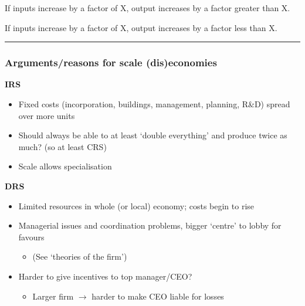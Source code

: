 \documentclass[]{article}
\providecommand{\tightlist}{%
  \setlength{\itemsep}{0pt}\setlength{\parskip}{0pt}}
\begin{document}
\bigskip

\begin{description}
\tightlist
\item[Increasing returns to scale (IRS)]
If inputs increase by a factor of X, output increases by a factor
greater than X.
\item[Decreasing returns to scale (DRS)]
If inputs increase by a factor of X, output increases by a factor less
than X.
\end{description}

\begin{center}\rule{0.5\linewidth}{\linethickness}\end{center}

\hypertarget{IRS-DRS-reasons}{%
\subsubsection{Arguments/reasons for scale
(dis)economies}\label{IRS-DRS-reasons}}

\textbf{IRS}

\begin{itemize}
\tightlist
\item
  Fixed costs (incorporation, buildings, management, planning, R\&D)
  spread over more units
\item
  Should always be able to at least `double everything' and produce
  twice as much? (so at least CRS)
\item
  Scale allows specialisation
\end{itemize}

\textbf{DRS}

\begin{itemize}
\tightlist
\item
  Limited resources in whole (or local) economy; costs begin to rise
\item
  Managerial issues and coordination problems, bigger `centre' to lobby
  for favours

  \begin{itemize}
  \tightlist
  \item
    (See `theories of the firm')
  \end{itemize}
\item
  Harder to give incentives to top manager/CEO?

  \begin{itemize}
  \tightlist
  \item
    Larger firm \(\rightarrow\) harder to make CEO liable for losses
  \end{itemize}
\end{itemize}
\end{document}
